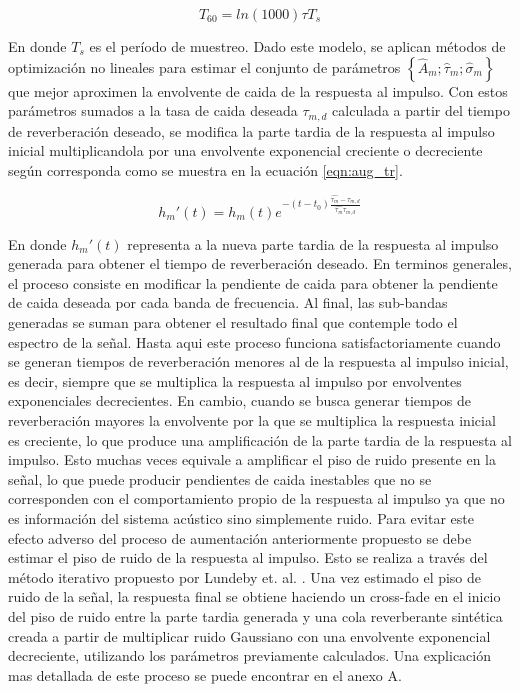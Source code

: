 \begin{equation}
\label{eqn:tau60}
	T_{60} = ln(1000)\tau T_{s}
\end{equation}

En donde $T_{s}$ es el período de muestreo. Dado este modelo, se aplican métodos de optimización no lineales para estimar el conjunto de parámetros $\left \{ \hat{A}_{m}; \hat{\tau}_{m}; \hat{\sigma}_{m} \right \}$ que mejor aproximen la envolvente de caida de la respuesta al impulso. Con estos parámetros sumados a la tasa de caida deseada $\tau_{m,d}$ calculada a partir del tiempo de reverberación deseado, se modifica la parte tardia de la respuesta al impulso inicial multiplicandola por una envolvente exponencial creciente o decreciente según corresponda como se muestra en la ecuación  \ref{eqn:aug_tr}.

\begin{equation}
\label{eqn:aug_tr}
	{h_{m}}'(t) = h_{m}(t) e^{-(t-t_{0})\frac{\hat{\tau_{m}}-\tau_{m,d}}{\hat{\tau_{m}}\tau_{m,d}}}
\end{equation}

En donde ${h_{m}}'(t)$ representa a la nueva parte tardia de la respuesta al impulso generada para obtener el tiempo de reverberación deseado. En terminos generales, el proceso consiste en modificar la pendiente de caida para obtener la pendiente de caida deseada por cada banda de frecuencia. Al final, las sub-bandas generadas se suman para obtener el resultado final que contemple todo el espectro de la señal. Hasta aqui este proceso funciona satisfactoriamente cuando se generan tiempos de reverberación menores al de la respuesta al impulso inicial, es decir, siempre que se multiplica la respuesta al impulso por envolventes exponenciales decrecientes. En cambio, cuando se busca generar tiempos de reverberación mayores la envolvente por la que se multiplica la respuesta inicial es creciente, lo que produce una amplificación de la parte tardia de la respuesta al impulso. Esto muchas veces equivale a amplificar el piso de ruido presente en la señal, lo que puede producir pendientes de caida inestables que no se corresponden con el comportamiento propio de la respuesta al impulso ya que no es información del sistema acústico sino simplemente ruido. Para evitar este efecto adverso del proceso de aumentación anteriormente propuesto se debe estimar el piso de ruido de la respuesta al impulso. Esto se realiza a través del método iterativo propuesto por Lundeby et. al. \cite{Lundeby}. Una vez estimado el piso de ruido de la señal, la respuesta final se obtiene haciendo un cross-fade en el inicio del piso de ruido entre la parte tardia generada y una cola reverberante sintética creada a partir de multiplicar ruido Gaussiano con una envolvente exponencial decreciente, utilizando los parámetros previamente calculados. Una explicación mas detallada de este proceso se puede encontrar en el anexo A. 

